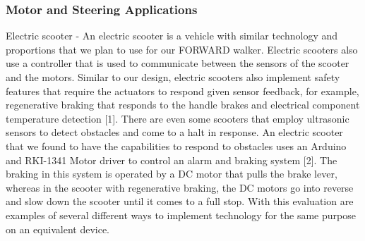 \subsubsection{Motor and Steering Applications} 
\noindent Electric scooter - An electric scooter is a vehicle with similar technology and proportions that we plan to use for our FORWARD walker. Electric scooters also use a controller that is used to communicate between the sensors of the scooter and the motors. Similar to our design, electric scooters also implement safety features that require the actuators to respond given sensor feedback, for example, regenerative braking that responds to the handle brakes and electrical component temperature detection [1]. There are even some scooters that employ ultrasonic sensors to detect obstacles and come to a halt in response. An electric scooter that we found to have the capabilities to respond to obstacles uses an Arduino and RKI-1341 Motor driver to control an alarm and braking system [2]. The braking in this system is operated by a DC motor that pulls the brake lever, whereas in the scooter with regenerative braking, the DC motors go into reverse and slow down the scooter until it comes to a full stop. With this evaluation are examples of several different ways to implement technology for the same purpose on an equivalent device. 
